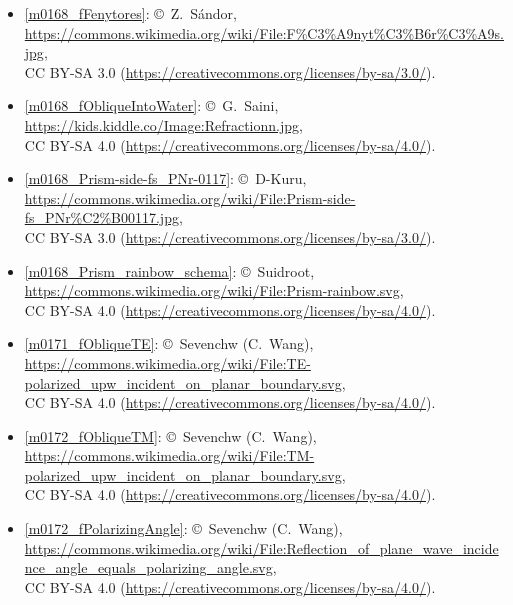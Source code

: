 \begin{itemize}
\item[Fig.] \label{m0168_fFenytores_Credit}
  \ref{m0168_fFenytores}:
  \copyright~Z.\ S\'{a}ndor, 
  \url{https://commons.wikimedia.org/wiki/File:F%C3%A9nyt%C3%B6r%C3%A9s.jpg},\\ 
  CC BY-SA 3.0 (\url{https://creativecommons.org/licenses/by-sa/3.0/}).

\item[Fig.] \label{m0168_fObliqueIntoWater_Credit}
  \ref{m0168_fObliqueIntoWater}:
  \copyright~G.\ Saini, 
  \url{https://kids.kiddle.co/Image:Refractionn.jpg},\\ 
  CC BY-SA 4.0 (\url{https://creativecommons.org/licenses/by-sa/4.0/}).

\item[Fig.] \label{m0168_Prism-side-fs_PNr-0117_Credit}
  \ref{m0168_Prism-side-fs_PNr-0117}:
  \copyright~D-Kuru, 
  \url{https://commons.wikimedia.org/wiki/File:Prism-side-fs_PNr%C2%B00117.jpg},\\ 
  CC BY-SA 3.0 (\url{https://creativecommons.org/licenses/by-sa/3.0/}).

\item[Fig.] \label{m0168_Prism_rainbow_schema_Credit}
  \ref{m0168_Prism_rainbow_schema}:
  \copyright~Suidroot, 
  \url{https://commons.wikimedia.org/wiki/File:Prism-rainbow.svg},\\ 
  CC BY-SA 4.0 (\url{https://creativecommons.org/licenses/by-sa/4.0/}).

\item[Fig.] \label{m0171_fObliqueTE_Credit}
  \ref{m0171_fObliqueTE}:
  \copyright~Sevenchw (C.\ Wang), 
  \url{https://commons.wikimedia.org/wiki/File:TE-polarized_upw_incident_on_planar_boundary.svg},\\ 
  CC BY-SA 4.0 (\url{https://creativecommons.org/licenses/by-sa/4.0/}).

\item[Fig.] \label{m0172_fObliqueTM_Credit}
  \ref{m0172_fObliqueTM}:
  \copyright~Sevenchw (C.\ Wang), 
  \url{https://commons.wikimedia.org/wiki/File:TM-polarized_upw_incident_on_planar_boundary.svg},\\ 
  CC BY-SA 4.0 (\url{https://creativecommons.org/licenses/by-sa/4.0/}).

\item[Fig.] \label{m0172_fPolarizingAngle_Credit}
  \ref{m0172_fPolarizingAngle}:
  \copyright~Sevenchw (C.\ Wang), 
  \url{https://commons.wikimedia.org/wiki/File:Reflection_of_plane_wave_incidence_angle_equals_polarizing_angle.svg},\\ 
  CC BY-SA 4.0 (\url{https://creativecommons.org/licenses/by-sa/4.0/}).


\end{itemize}
